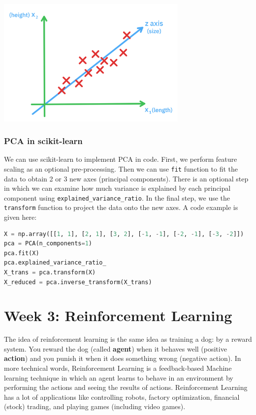 \documentclass[a4paper, 12pt]{book}
\begin{document}
\begin{center}
    \includegraphics[width=0.7\textwidth]{graphics/pca.png}
\end{center}

\subsubsection{PCA in scikit-learn}

We can use scikit-learn to implement PCA in code. First, we perform feature scaling as an optional pre-processing. Then we can use \verb|fit| function to fit the data to obtain 2 or 3 new axes (principal components). There is an optional step in which we can examine how much variance is explained by each principal component using \verb|explained_variance_ratio|. In the final step, we use the \verb|transform| function to project the data onto the new axes. A code example is given here:

\begin{lstlisting}[language=Python]
X = np.array([[1, 1], [2, 1], [3, 2], [-1, -1], [-2, -1], [-3, -2]])
pca = PCA(n_components=1)
pca.fit(X)
pca.explained_variance_ratio_
X_trans = pca.transform(X)
X_reduced = pca.inverse_transform(X_trans)
\end{lstlisting}

\section{Week 3: Reinforcement Learning}

The idea of reinforcement learning is the same idea as training a dog: by a reward system. You reward the dog (called \textbf{agent}) when it behaves well (positive \textbf{action}) and you punish it when it does something wrong (negative action). In more technical words, Reinforcement Learning is a feedback-based Machine learning technique in which an agent learns to behave in an environment by performing the actions and seeing the results of actions. Reinforcement Learning has a lot of applications like controlling robots, factory optimization, financial (stock) trading, and playing games (including video games). 
\end{document}
